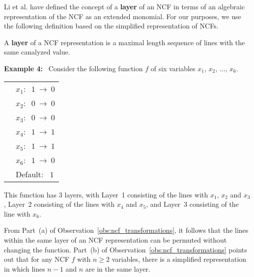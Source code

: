 Li et al. \cite{Li-etal-2013} have defined the concept of a 
{\bf layer} of an NCF in terms of
an algebraic representation of the NCF as an extended monomial.
For our purposes, we use the following definition based on the
simplified representation of NCFs.

\begin{definition}
\label{def:layer}
A {\bf layer} of a NCF representation is a maximal length sequence 
of lines with the same canalyzed value.
\end{definition}

\noindent
\textbf{Example 4:}~ Consider the following function $f$ of six variables
$x_1$, $x_2$, $\ldots$, $x_6$. 

\bigskip

\noindent
\begin{tabular}{ll}
\hspace*{1.1in} & $x_1:~$  $1 ~\longrightarrow~ 0$ \\ [0.5ex]
\hspace*{1.1in} & $x_2:~$  $0 ~\longrightarrow~ 0$ \\ [0.5ex]
\hspace*{1.1in} & $x_3:~$  $0 ~\longrightarrow~ 0$ \\ [0.5ex]
\hspace*{1.1in} & $x_4:~$  $1 ~\longrightarrow~ 1$ \\ [0.5ex]
\hspace*{1.1in} & $x_5:~$  $1 ~\longrightarrow~ 1$ \\ [0.5ex]
\hspace*{1.1in} & $x_6:~$  $1 ~\longrightarrow~ 0$ \\ [0.5ex]
\hspace*{1.1in} & Default:~ $1$ \\
\end{tabular}

\medskip
\noindent
This function has 3 layers, with 
Layer~1 consisting of the lines with $x_1$, $x_2$ and $x_3$, 
Layer~2 consisting of the lines with $x_4$ and $x_5$, and
Layer~3 consisting of the line with $x_6$.  %

\medskip
From Part~(a) of Observation~\ref{obs:ncf_transformations},
it follows that the lines within the same layer of an NCF
representation can be permuted without changing the function.
Part~(b) of Observation~\ref{obs:ncf_transformations} points
out that for any NCF $f$ with $n \geq 2$ variables, there is a simplified 
representation in which lines $n-1$ and $n$ are in the same layer.

